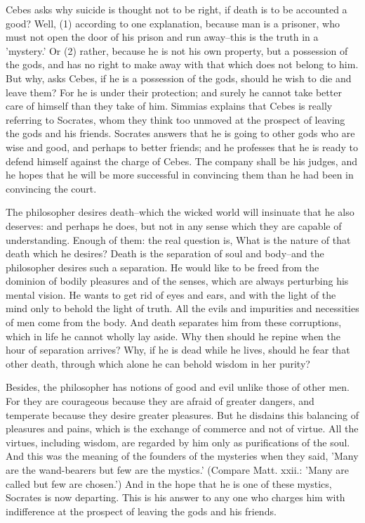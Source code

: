 Cebes asks why suicide is thought not to be right, if death is to be
accounted a good? Well, (1) according to one explanation, because man is
a prisoner, who must not open the door of his prison and run away--this
is the truth in a 'mystery.' Or (2) rather, because he is not his own
property, but a possession of the gods, and has no right to make away
with that which does not belong to him. But why, asks Cebes, if he is a
possession of the gods, should he wish to die and leave them? For he is
under their protection; and surely he cannot take better care of himself
than they take of him. Simmias explains that Cebes is really referring
to Socrates, whom they think too unmoved at the prospect of leaving the
gods and his friends. Socrates answers that he is going to other gods
who are wise and good, and perhaps to better friends; and he professes
that he is ready to defend himself against the charge of Cebes.
The company shall be his judges, and he hopes that he will be more
successful in convincing them than he had been in convincing the court.

The philosopher desires death--which the wicked world will insinuate
that he also deserves: and perhaps he does, but not in any sense which
they are capable of understanding. Enough of them: the real question
is, What is the nature of that death which he desires? Death is
the separation of soul and body--and the philosopher desires such
a separation. He would like to be freed from the dominion of bodily
pleasures and of the senses, which are always perturbing his mental
vision. He wants to get rid of eyes and ears, and with the light of the
mind only to behold the light of truth. All the evils and impurities
and necessities of men come from the body. And death separates him from
these corruptions, which in life he cannot wholly lay aside. Why then
should he repine when the hour of separation arrives? Why, if he is dead
while he lives, should he fear that other death, through which alone he
can behold wisdom in her purity?

Besides, the philosopher has notions of good and evil unlike those of
other men. For they are courageous because they are afraid of greater
dangers, and temperate because they desire greater pleasures. But he
disdains this balancing of pleasures and pains, which is the exchange
of commerce and not of virtue. All the virtues, including wisdom, are
regarded by him only as purifications of the soul. And this was the
meaning of the founders of the mysteries when they said, 'Many are the
wand-bearers but few are the mystics.' (Compare Matt. xxii.: 'Many are
called but few are chosen.') And in the hope that he is one of these
mystics, Socrates is now departing. This is his answer to any one who
charges him with indifference at the prospect of leaving the gods and
his friends.

